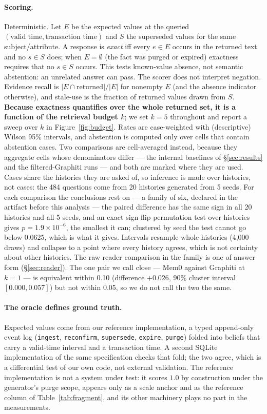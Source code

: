 \documentclass[conference]{IEEEtran}
\begin{document}
\paragraph{Scoring.} Deterministic. Let $E$ be the expected values at the queried
$(\text{valid time}, \text{transaction time})$ and $S$ the superseded values for
the same subject/attribute. A response is \emph{exact} iff every $e \in E$ occurs
in the returned text and no $s \in S$ does; when $E = \emptyset$ (the fact was
purged or expired) exactness requires that no $s \in S$ occurs. This tests
known-value absence, not semantic abstention: an unrelated answer can pass.
The scorer does not interpret negation. Evidence recall is $|E \cap \text{returned}| / |E|$ for nonempty $E$
(and the absence indicator otherwise), and stale-use is
the fraction of returned values drawn from $S$. \textbf{Because exactness
quantifies over the whole returned set, it is a function of the retrieval budget
$k$}; we set $k{=}5$ throughout and report a sweep over $k$ in
Figure~\ref{fig:budget}. Rates are case-weighted with (descriptive) Wilson 95\%
intervals, and
abstention is computed only over cells that contain abstention cases. Two
comparisons are cell-averaged instead, because they aggregate cells whose
denominators differ --- the internal baselines of \S\ref{sec:results} and
the filtered-Graphiti runs --- and both are marked where they are used.
Cases share the histories they are asked of, so inference is made over
histories, not cases: the 484 questions come from 20 histories generated from 5
seeds. For each comparison the conclusions rest on --- a family of six, declared
in the artifact before this analysis --- the paired difference has the same sign
in all 20 histories and all 5 seeds, and an exact sign-flip permutation test over
histories gives $p = 1.9 \times 10^{-6}$, the smallest it can; clustered by seed
the test cannot go below $0.0625$, which is what it gives. Intervals resample
whole histories (4{,}000 draws) and collapse to a point where every history
agrees, which is not certainty about other histories. The raw reader comparison
in the family is one of answer form (\S\ref{sec:reader}). The one pair we call
close --- Mem0 against Graphiti at $k{=}1$ --- is equivalent within 0.10
(difference $+0.026$, 90\% cluster interval $[0.000, 0.057]$) but not within
0.05, so we do not call the two the same.

\paragraph{The oracle defines ground truth.} Expected values come from our
reference implementation, a typed append-only event log (\texttt{ingest},
\texttt{reconfirm}, \texttt{supersede}, \texttt{expire}, \texttt{purge}) folded
into beliefs that carry a valid-time interval and a transaction time. A second
SQLite implementation of the same specification checks that fold; the two agree,
which is a differential test of our own code, not external validation. The
reference implementation is not a system under test: it scores $1.0$ by
construction under the generator's purge scope, appears only as a scale anchor
and as the reference column of Table~\ref{tab:fragment}, and its other machinery
plays no part in the measurements.
\end{document}
